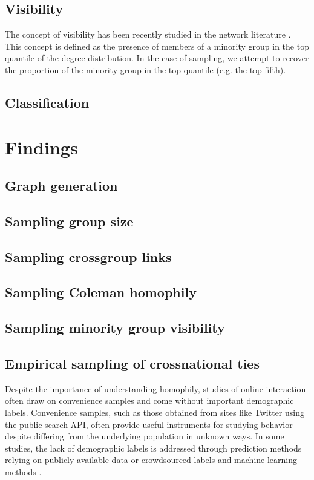 \documentclass[a4paper]{article}
\begin{document}
\subsection{Visibility}

The concept of visibility has been recently studied in the network literature \cite{karimi_visibility_2017, wagner_sampling_2017}. This concept is defined as the presence of members of a minority group in the top quantile of the degree distribution. In the case of sampling, we attempt to recover the proportion of the minority group in the top  quantile (e.g. the top fifth).


\subsection{Classification}

\section{Findings}

\subsection{Graph generation}

\subsection{Sampling group size}

\subsection{Sampling crossgroup links}

\subsection{Sampling Coleman homophily}

\subsection{Sampling minority group visibility}

\subsection{Empirical sampling of crossnational ties}


\newpage

Despite the importance of understanding homophily, studies of online interaction often draw on convenience samples and come without important demographic labels. Convenience samples, such as those obtained from sites like Twitter using the public search API, often provide useful instruments for studying behavior despite differing from the underlying population in unknown ways. In some studies, the lack of demographic labels is addressed through prediction methods relying on publicly available data \cite{} or crowdsourced labels and machine learning methods \cite{}.
\end{document}
